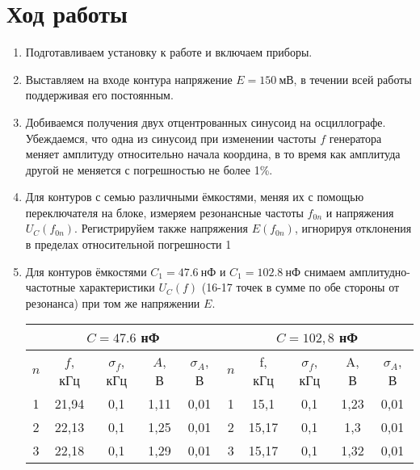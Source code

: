 \documentclass[a4paper,12pt]{extreport}
\begin{document}
\section*{Ход работы}
\begin{enumerate}
\item Подготавливаем установку к работе и включаем приборы.
\item Выставляем на входе контура напряжение $E = 150~\text{мВ}$, в течении всей работы поддерживая его постоянным.
\item Добиваемся получения двух отцентрованных синусоид на осциллографе. Убеждаемся, что одна из синусоид при изменении частоты $f$ генератора меняет амплитуду относительно начала координа, в то время как амплитуда другой не меняется с погрешностью не более 1\%.
\item Для контуров с семью различными ёмкостями, меняя их с помощью переключателя на
блоке, измеряем резонансные частоты $f_{0n}$ и напряжения $U_C(f_{0n})$. Регистрируйем также
напряжения $E(f_{0n})$, игнорируя отклонения в пределах относительной погрешности 1%
\item Для контуров ёмкостями $C_1 = 47.6~\text{нФ}$ и $C_1 = 102.8~\text{нФ}$ снимаем амплитудно-частотные характеристики $U_C(f)$ (16-17 точек
в сумме по обе стороны от резонанса) при том же напряжении $E$.
\begin{table}[h]
\centering
\begin{tabular}{ccccc||c|c|c|c|c|}
\hline
\multicolumn{5}{|c||}{$C = 47.6$ нФ}                                                                                                         & \multicolumn{5}{c|}{$C = 102,8$ нФ}        \\ \hline
\multicolumn{1}{|c|}{$n$} & \multicolumn{1}{c|}{$f$, кГц} & \multicolumn{1}{c|}{$\sigma_f$, кГц} & \multicolumn{1}{c|}{$A$, В} & $\sigma_A$, В         & $n$ & f, кГц & $\sigma_f$, кГц & A, В & $\sigma_A$, В \\ \hline
\multicolumn{1}{|c|}{1}   & \multicolumn{1}{c|}{21,94}     & \multicolumn{1}{c|}{0,1}             & \multicolumn{1}{c|}{1,11}   & 0,01                  & 1   & 15,1    & 0,1             & 1,23 & 0,01          \\ \hline
\multicolumn{1}{|c|}{2}   & \multicolumn{1}{c|}{22,13}     & \multicolumn{1}{c|}{0,1}             & \multicolumn{1}{c|}{1,25}   & 0,01                  & 2   & 15,17   & 0,1             & 1,3 & 0,01          \\ \hline
\multicolumn{1}{|c|}{3}   & \multicolumn{1}{c|}{22,18}       & \multicolumn{1}{c|}{0,1}             & \multicolumn{1}{c|}{1,29}   & 0,01                  & 3   & 15,17   & 0,1             & 1,32 & 0,01          \\ \hline

\end{tabular}
\end{table}
\end{enumerate}
\end{document}
